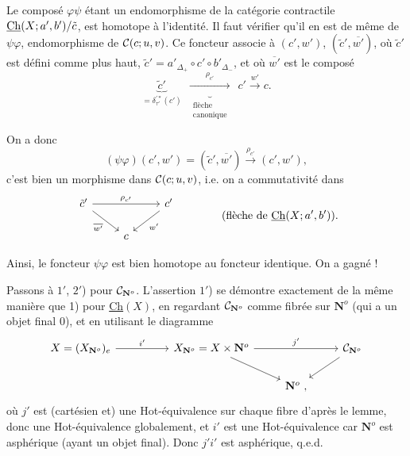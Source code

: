 Le composé $\varphi\psi$ étant un endomorphisme de la catégorie contractile $\underline{\mathrm{Ch}}(X;a',b')/\tilde{c}$, est homotope à l'identité. Il faut vérifier qu'il en est de même de $\psi\varphi$, endomorphisme de $\mathcal{C}(c;u,v)$. Ce foncteur associe à $(c',w')$, $(\tilde{c}',\overline{w'})$, où $\tilde{c}'$ est défini comme plus haut, $\tilde{c}' = a'_{\Delta_{+}} \circ c' \circ b'_{\Delta_{-}}$, et où $\overline{w'}$ est le composé
\[
\underbrace{\tilde{c}'}_{= \delta^{\prime *}_{\tau'}(c')}\ \ \underbrace{\xrightarrow{\ \rho_{c'}\ }}_{\substack{\text{flèche}\\ \text{canonique}}}\ \ c' \xrightarrow{w'} c.
\]

On a donc
\[
(\psi\varphi)(c',w') = (\tilde{c}',\overline{w'}) \xrightarrow{\rho_{c'}} (c',w'),
\]
c'est bien un morphisme dans $\mathcal{C}(c;u,v)$, i.e. on a commutativité dans
\[
\begin{tikzcd}
\tilde{c}' \ar[rr,"\rho_{c'}"] \ar[dr,"\overline{w'}"'] & & c' \ar[dl,"w'"] \\
& c &
\end{tikzcd}
\qquad\qquad \text{(flèche de } \Ch(X;a',b')\text{).}
\]


Ainsi, le foncteur $\psi\varphi$ est bien homotope au foncteur identique. On a gagné !

Passons à $1'$, $2'$) pour $\mathcal{C}_{\mathbf{N}^o}$. L'assertion $1'$) se démontre exactement de la même manière que 1) pour \underline{Ch}$(X)$, en regardant $\mathcal{C}_{\mathbf{N}^o}$ comme fibrée sur $\mathbf{N}^o$ (qui a un objet final 0), et en utilisant le diagramme
\[
\begin{tikzcd}
X = (X_{\mathbf{N}^o})_e \arrow[rr, "i'"] & & X_{\mathbf{N}^o} = X \times \mathbf{N}^o \arrow[rr, "j'"] \arrow[dr] & & \mathcal{C}_{\mathbf{N}^o} \arrow[dl] \\
 & & & \mathbf{N}^o \ , &
\end{tikzcd}
\]
où $j'$ est (cartésien et) une Hot-équivalence sur chaque fibre d'après le lemme, donc une Hot-équivalence globalement, et $i'$ est une Hot-équivalence car $\mathbf{N}^o$ est asphérique (ayant un objet final). Donc $j'i'$ est asphérique, q.e.d.

